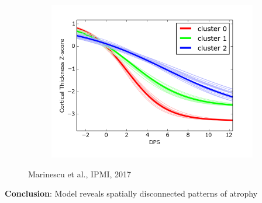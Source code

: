 \documentclass[10pt,xcolor=table]{beamer}
\begin{document}
\begin{frame}
\begin{figure}[h]
\begin{subfigure}[b]{0.3\textwidth}
  \end{subfigure}
    \begin{subfigure}[b]{0.3\textwidth}
    \centering
    \includegraphics[width=\scalingFactorTraj\textwidth]{../images/vwdpm/trajSamplesOneFig_drcThavgFWHM0InithistCl3Pr0Ra1_VWDPMStdPCA.png}
  \end{subfigure}
  
Marinescu et al., IPMI, 2017
\end{figure}

\textbf{Conclusion}: Model reveals spatially disconnected patterns of atrophy

\end{frame}
\end{document}

